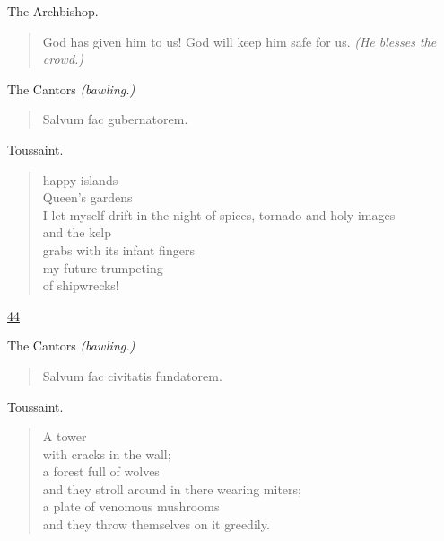 \documentclass[letterpaper,article,12pt,oneside,notitlepage]{memoir}
\begin{document}
\begin{center}The Archbishop.\end{center}

\begin{verse}
God has given him to us! God will keep him safe for us. \textit{(He blesses the crowd.)} \\
\end{verse}

\begin{center}The Cantors  \textit{(bawling.)}\end{center}

\begin{verse}
Salvum fac gubernatorem. \\
\end{verse}

\begin{center}Toussaint.\end{center}

\begin{verse}
happy islands \\
Queen's gardens \\
I let myself drift in the night of spices, tornado and holy images \\
and the kelp \\
grabs with its infant fingers \\
my future trumpeting \\
of shipwrecks! \\
\end{verse}

\clearpage

\href{http://cesaire.elotroalex.com/chiens/chiens/p044.html}{44}

\begin{center}The Cantors  \textit{(bawling.)}\end{center}

\begin{verse}
Salvum fac civitatis fundatorem. \\
\end{verse}

\begin{center}Toussaint.\end{center}

\begin{verse}
A tower \\
with cracks in the wall; \\
a forest full of wolves \\
and they stroll around in there wearing miters; \\
a plate of venomous mushrooms \\
and they throw themselves on it greedily. \\
\end{verse}
\end{document}
